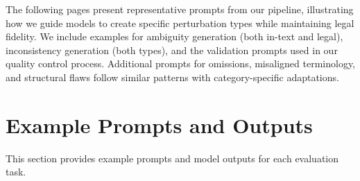 \documentclass[11pt]{article}
\begin{document}
The following pages present representative prompts from our pipeline, illustrating how we guide models to create specific perturbation types while maintaining legal fidelity. We include examples for ambiguity generation (both in-text and legal), inconsistency generation (both types), and the validation prompts used in our quality control process. Additional prompts for omissions, misaligned terminology, and structural flaws follow similar patterns with category-specific adaptations.

\section{Example Prompts and Outputs}
\label{sec:appendix-prompts}

This section provides example prompts and model outputs for each evaluation task.
\end{document}
